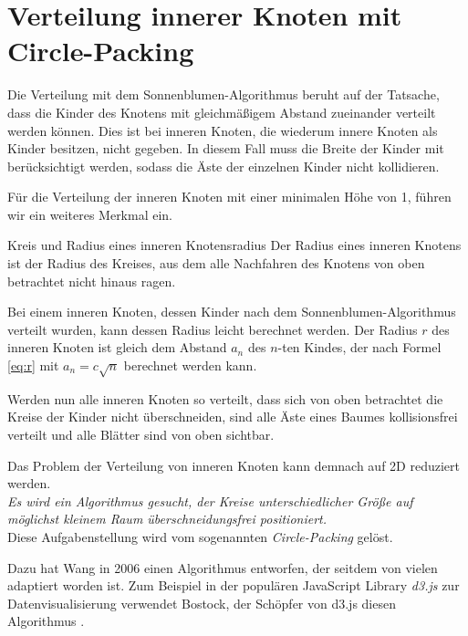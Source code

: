 \section{Verteilung innerer Knoten mit Circle-Packing}
\label{sec:circle-packing}

Die Verteilung mit dem Sonnenblumen-Algorithmus beruht auf der Tatsache, dass die Kinder des Knotens mit gleichmäßigem Abstand zueinander verteilt werden können. Dies ist bei inneren Knoten, die wiederum innere Knoten als Kinder besitzen, nicht gegeben. In diesem Fall muss die Breite der Kinder mit berücksichtigt werden, sodass die Äste der einzelnen Kinder nicht kollidieren.

Für die Verteilung der inneren Knoten mit einer minimalen Höhe von 1, führen wir ein weiteres Merkmal ein.

\begin{defbox}{Kreis und Radius eines inneren Knotens}{radius}
   Der Radius eines inneren Knotens ist der Radius des Kreises, aus dem alle Nachfahren des Knotens von oben betrachtet nicht hinaus ragen.
\end{defbox}

Bei einem inneren Knoten, dessen Kinder nach dem Sonnenblumen-Algorithmus verteilt wurden, kann dessen Radius leicht berechnet werden. Der Radius $r$ des inneren Knoten ist gleich dem Abstand $a_n$ des $n$-ten Kindes, der nach Formel \ref{eq:r} mit $a_n = c \sqrt{n}$ berechnet werden kann.

Werden nun alle inneren Knoten so verteilt, dass sich von oben betrachtet die Kreise der Kinder nicht überschneiden, sind alle Äste eines Baumes kollisionsfrei verteilt und alle Blätter sind von oben sichtbar.

Das Problem der Verteilung von inneren Knoten kann demnach auf 2D reduziert werden.\\

\textit{Es wird ein Algorithmus gesucht, der Kreise unterschiedlicher Größe auf möglichst kleinem Raum überschneidungsfrei positioniert.}\\

Diese Aufgabenstellung wird vom sogenannten \textit{Circle-Packing} gelöst.

Dazu hat Wang in \cite{wang2006visualization} 2006 einen Algorithmus entworfen, der seitdem von vielen adaptiert worden ist. Zum Beispiel in der populären JavaScript Library \textit{d3.js} zur Datenvisualisierung verwendet Bostock, der Schöpfer von d3.js diesen Algorithmus \cite{bostock2017abetter}.

